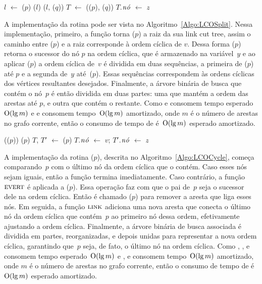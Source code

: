 \begin{algorithm}[htb]
\caption{\LCOMerge($p$, $q$, $z$)}
\label{Algo:LCOMerge}
\begin{algorithmic}[1]
\State $l$ $\gets$ \treapLast($p$)
\State \linkcutEvert($l$)
\State \linkcutAddEdge($l$, \treapFirst($q$))
\State $T$ $\gets$ \treapJoin(\treapGetRoot($p$), \treapGetRoot($q$))
\State $T$.$\mathit{n\acute{o}}$ $\gets$ $z$
\end{algorithmic}
\end{algorithm}

A implementação da rotina \LCOSplit{} pode ser vista no Algoritmo~\ref{Algo:LCOSplit}.
Nessa implementação, primeiro, a função \linkcutEvert{} torna \treapLast($p$) a raiz da sua link cut tree, assim o caminho entre \treapFirst($p$) e a raiz corresponde à ordem cíclica de $v$.
Dessa forma \linkcutParent($p$) retorna o sucessor do nó $p$ na ordem cíclica, que é armazenado na variável~$y$ e ao aplicar \linkcutDelEdge($p$) a ordem cíclica de~$v$ é dividida em duas sequências, a primeira de \treapFirst($p$) até $p$ e a segunda de~$y$ até~\treapLast($p$).
Essas sequências correspondem às ordens cíclicas dos vértices resultantes desejados.
Finalmente, a árvore binária de busca que contém o nó~$p$ é então dividida em duas partes: uma que mantém a ordem das arestas até $p$, e outra que contém o restante.
Como \treapLast{} e \treapSplitRight{} consomem tempo esperado~$\mathrm{O}(\lg m)$ e \linkcutEvert{} e \linkcutDelEdge{} consomem tempo~$\mathrm{O}(\lg m)$ amortizado, onde $m$ é o número de arestas no grafo corrente, então o consumo de tempo de \LCOSplit{} é~$\mathrm{O}(\lg m)$ esperado amortizado.

\begin{algorithm}[htb]
\caption{\LCOSplit($p$, $v$, $z$)}
\label{Algo:LCOSplit}
\begin{algorithmic}[1]
\State \linkcutEvert(\treapLast($p$))
\State \linkcutDelEdge($p$)
\State $T$, $T'$ $\gets$ \treapSplitRight($p$)
\State $T$.$\mathit{n\acute{o}}$ $\gets$ $v$; $T'$.$\mathit{n\acute{o}}$ $\gets$ $z$
\end{algorithmic}
\end{algorithm}


A implementação da rotina \LCOCycle($p$), descrita no Algoritmo~\ref{Algo:LCOCycle}, começa comparando~$p$ com o último nó da ordem cíclica que o contém.
Caso esses nós sejam iguais, então a função termina imediatamente.
Caso contrário, a função $\text{\scshape \text{\scshape evert}}$ é aplicada a \treapLast($p$).
Essa operação faz com que o pai de~$p$ seja o sucessor dele na ordem cíclica.
Então é chamado \linkcutDelEdge($p$) para remover a aresta que liga esses nós.
Em seguida, a função $\text{\scshape link}$ adiciona uma nova aresta que conecta o último nó da ordem cíclica que contém~$p$ ao primeiro nó dessa ordem, efetivamente ajustando a ordem cíclica.
Finalmente, a árvore binária de busca associada é dividida em partes, reorganizadas, e depois unidas para representar a nova ordem cíclica, garantindo que~$p$ seja, de fato, o último nó na ordem cíclica.
Como \treapFirst{}, \treapLast{}, \treapSplitRight{} e \treapJoin{} consomem tempo esperado~$\mathrm{O}(\lg m)$ e \linkcutEvert{}, \linkcutDelEdge{} e \linkcutAddEdge{} consomem tempo~$\mathrm{O}(\lg m)$ amortizado, onde $m$ é o número de arestas no grafo corrente, então o consumo de tempo de \LCOCycle{} é~$\mathrm{O}(\lg m)$ esperado amortizado.


